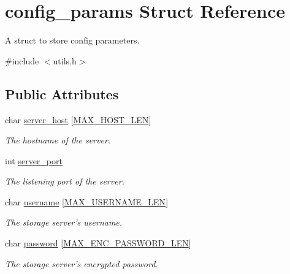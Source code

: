 \hypertarget{structconfig__params}{\section{config\-\_\-params Struct Reference}
\label{structconfig__params}
}


A struct to store config parameters.  




{\ttfamily \#include $<$utils.\-h$>$}

\subsection*{Public Attributes}
\begin{DoxyCompactItemize}
\item 
\hypertarget{structconfig__params_a962b7bcdbee26333fa776115ed066fb3}{char \hyperlink{structconfig__params_a962b7bcdbee26333fa776115ed066fb3}{server\-\_\-host} \mbox{[}\hyperlink{storage_8h_aa746ad89d7f59a152f37e3529057bd58}{M\-A\-X\-\_\-\-H\-O\-S\-T\-\_\-\-L\-E\-N}\mbox{]}}\label{structconfig__params_a962b7bcdbee26333fa776115ed066fb3}

\begin{DoxyCompactList}\small\item\em The hostname of the server. \end{DoxyCompactList}\item 
\hypertarget{structconfig__params_aa7103926e2d35a5d3461a5081723bdcd}{int \hyperlink{structconfig__params_aa7103926e2d35a5d3461a5081723bdcd}{server\-\_\-port}}\label{structconfig__params_aa7103926e2d35a5d3461a5081723bdcd}

\begin{DoxyCompactList}\small\item\em The listening port of the server. \end{DoxyCompactList}\item 
\hypertarget{structconfig__params_a4793ceaa4b04decbe50ff4fa9fdde145}{char \hyperlink{structconfig__params_a4793ceaa4b04decbe50ff4fa9fdde145}{username} \mbox{[}\hyperlink{storage_8h_a6c4647395896246d6710ba980c31666c}{M\-A\-X\-\_\-\-U\-S\-E\-R\-N\-A\-M\-E\-\_\-\-L\-E\-N}\mbox{]}}\label{structconfig__params_a4793ceaa4b04decbe50ff4fa9fdde145}

\begin{DoxyCompactList}\small\item\em The storage server's username. \end{DoxyCompactList}\item 
\hypertarget{structconfig__params_a287adb79846d3b33b2e2bdd0cd12f901}{char \hyperlink{structconfig__params_a287adb79846d3b33b2e2bdd0cd12f901}{password} \mbox{[}\hyperlink{storage_8h_aa13f93b74a500b0fd36cf2fd2fa5f30b}{M\-A\-X\-\_\-\-E\-N\-C\-\_\-\-P\-A\-S\-S\-W\-O\-R\-D\-\_\-\-L\-E\-N}\mbox{]}}\label{structconfig__params_a287adb79846d3b33b2e2bdd0cd12f901}

\begin{DoxyCompactList}\small\item\em The storage server's encrypted password. \end{DoxyCompactList}\end{DoxyCompactItemize}


